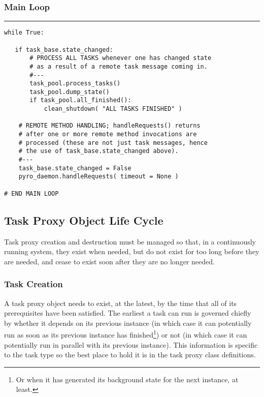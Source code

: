 \subsubsection{Main Loop}

{\small
\noindent
\rule{5cm}{.2mm}
\begin{lstlisting}
while True:

   if task_base.state_changed:
       # PROCESS ALL TASKS whenever one has changed state
       # as a result of a remote task message coming in. 
       #---
       task_pool.process_tasks()
       task_pool.dump_state()
       if task_pool.all_finished():
           clean_shutdown( "ALL TASKS FINISHED" )

    # REMOTE METHOD HANDLING; handleRequests() returns 
    # after one or more remote method invocations are 
    # processed (these are not just task messages, hence 
    # the use of task_base.state_changed above).
    #---
    task_base.state_changed = False
    pyro_daemon.handleRequests( timeout = None )

# END MAIN LOOP
\end{lstlisting}
}


\label{sec-task-messaging}


\subsection{Task Proxy Object Life Cycle}

Task proxy creation and destruction must be managed so that, in a
continuously running system, they exist when needed, but do not exist
for too long before they are needed, and cease to exist soon after they
are no longer needed.

\subsubsection{Task Creation}

A task proxy object needs to exist, at the latest, by the time that all
of its prerequisites have been satisfied.  The earliest a task can run
is governed chiefly by whether it depends on its previous
instance (in which case it can potentially run as soon as its previous
instance has finished\footnote{Or when it has generated its background
state for the next instance, at least.}) or not (in which case it can
potentially run in parallel with its previous instance). This
information is specific to the task type so the best place to hold it is
in the task proxy class definitions. 

